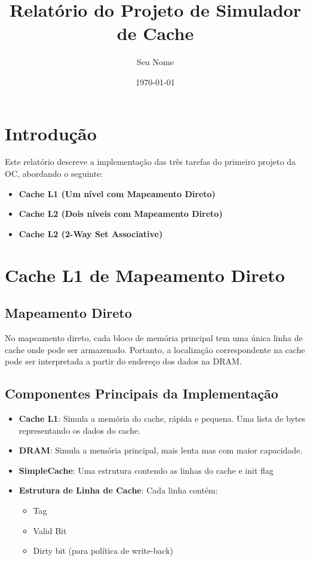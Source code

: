 \documentclass{article}
\title{Relatório do Projeto de Simulador de Cache}
\author{Seu Nome}
\date{\today}
\begin{document}
\maketitle

\section{Introdução}
Este relatório descreve a implementação das três tarefas do primeiro projeto da OC, abordando o seguinte:

\begin{itemize}
    \item \textbf{Cache L1 (Um nível com Mapeamento Direto)}
    \item \textbf{Cache L2 (Dois níveis com Mapeamento Direto)}
    \item \textbf{Cache L2 (2-Way Set Associative)}
\end{itemize}

\section{Cache L1 de Mapeamento Direto}
\subsection{Mapeamento Direto}
No mapeamento direto, cada bloco de memória principal tem uma única linha de cache onde pode ser armazenado. Portanto, a localização correspondente na cache pode ser interpretada a partir do endereço dos dados na DRAM.

\subsection{Componentes Principais da Implementação}
\begin{itemize}
\item \textbf{Cache L1}: Simula a memória do cache, rápida e pequena. Uma lista de bytes representando os dados do cache.
\item \textbf{DRAM}: Simula a memória principal, mais lenta mas com maior capacidade.
\item \textbf{SimpleCache}: Uma estrutura contendo as linhas do cache e init flag
\item \textbf{Estrutura de Linha de Cache}: Cada linha contém:
\begin{itemize}
\item Tag
\item Valid Bit
\item Dirty bit (para política de write-back)
\end{itemize}
\end{itemize}
\end{document}
